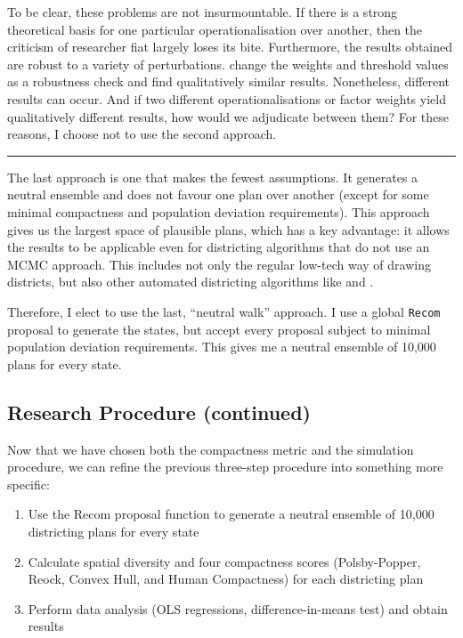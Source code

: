 \documentclass[]{article}
\providecommand{\tightlist}{%
  \setlength{\itemsep}{0pt}\setlength{\parskip}{0pt}}
\begin{document}
To be clear, these problems are not insurmountable. If there is a strong
theoretical basis for one particular operationalisation over another,
then the criticism of researcher fiat largely loses its bite.
Furthermore, the results obtained are robust to a variety of
perturbations. \cite{h2018} change the weights and threshold values as a
robustness check and find qualitatively similar results. Nonetheless,
different results can occur. And if two different operationalisations or
factor weights yield qualitatively different results, how would we
adjudicate between them? For these reasons, I choose not to use the
second approach.

\begin{center}\rule{0.5\linewidth}{\linethickness}\end{center}

The last approach is one that makes the fewest assumptions. It generates
a neutral ensemble and does not favour one plan over another (except for
some minimal compactness and population deviation requirements). This
approach gives us the largest space of plausible plans, which has a key
advantage: it allows the results to be applicable even for districting
algorithms that do not use an MCMC approach. This includes not only the
regular low-tech way of drawing districts, but also other automated
districting algorithms like \cite{mm2018} and \cite{lf2019}.

Therefore, I elect to use the last, ``neutral walk'' approach. I use a
global \texttt{Recom} proposal to generate the states, but accept every
proposal subject to minimal population deviation requirements. This
gives me a neutral ensemble of 10,000 plans for every state.

\hypertarget{research-procedure-continued}{%
\subsection{Research Procedure
(continued)}\label{research-procedure-continued}}

Now that we have chosen both the compactness metric and the simulation
procedure, we can refine the previous three-step procedure into
something more specific:

\begin{enumerate}
\def\labelenumi{\arabic{enumi}.}
\tightlist
\item
  Use the Recom proposal function to generate a neutral ensemble of
  10,000 districting plans for every state
\item
  Calculate spatial diversity and four compactness scores
  (Polsby-Popper, Reock, Convex Hull, and Human Compactness) for each
  districting plan
\item
  Perform data analysis (OLS regressions, difference-in-means test) and
  obtain results
\end{enumerate}
\end{document}
